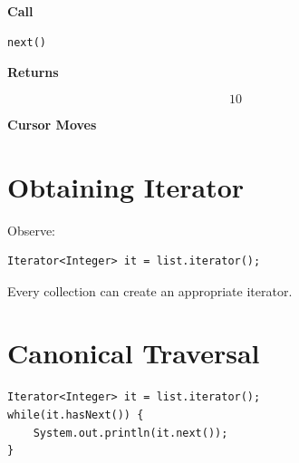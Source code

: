 \documentclass[11pt,a4paper]{book}
\begin{document}
\medskip

\textcolor{RosettaJade}{\textbf{Call}}

\begin{verbatim}
next()
\end{verbatim}

\medskip

\textcolor{RosettaDeepGreen}{\textbf{Returns}}

\[
\boxed{10}
\]

\medskip

\textcolor{RosettaRoyalPurple}{\textbf{Cursor Moves}}

\begin{center}
\end{center}

\section{Obtaining Iterator}

Observe:

\begin{verbatim} 
Iterator<Integer> it = list.iterator();
\end{verbatim}


Every collection can create
an appropriate iterator.


\section{Canonical Traversal}

\begin{verbatim} 
Iterator<Integer> it = list.iterator();
while(it.hasNext()) {
    System.out.println(it.next());
}
\end{verbatim}
\end{document}

